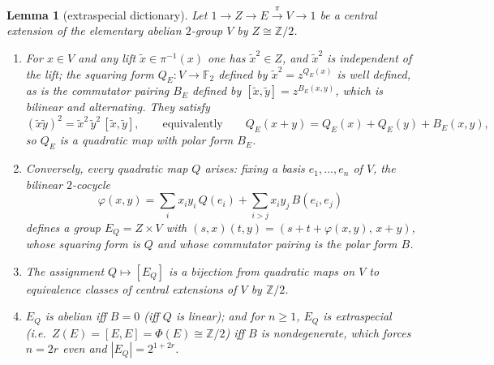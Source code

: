 \documentclass[11pt]{article}
\theoremstyle{plain}
\newtheorem{lemma}{Lemma}
\theoremstyle{definition}
\newcommand{\F}{\mathbb{F}}
\begin{document}
\begin{lemma}[extraspecial dictionary]\label{lem:extdict}
Let $1\to Z\to E\xrightarrow{\ \pi\ }V\to 1$ be a central extension of the
elementary abelian $2$-group $V$ by $Z\cong\mathbb{Z}/2$.
\begin{enumerate}[label=(\roman*),leftmargin=*]
\item For $x\in V$ and any lift $\tilde x\in\pi^{-1}(x)$ one has
$\tilde x^2\in Z$, and $\tilde x^2$ is independent of the lift; the
\emph{squaring form} $Q_E\colon V\to\F_2$ defined by
$\tilde x^2=z^{Q_E(x)}$ is well defined, as is the \emph{commutator pairing}
$B_E$ defined by $[\tilde x,\tilde y]=z^{B_E(x,y)}$, which is bilinear and
alternating. They satisfy
\[
(\tilde x\tilde y)^2=\tilde x^2\,\tilde y^2\,[\tilde x,\tilde y],
\qquad\text{equivalently}\qquad
Q_E(x+y)=Q_E(x)+Q_E(y)+B_E(x,y),
\]
so $Q_E$ is a quadratic map with polar form $B_E$.
\item Conversely, every quadratic map $Q$ arises: fixing a basis
$e_1,\dots,e_n$ of $V$, the bilinear $2$-cocycle
\[
\varphi(x,y)=\sum_i x_iy_i\,Q(e_i)+\sum_{i>j}x_iy_j\,B(e_i,e_j)
\]
defines a group $E_Q=Z\times V$ with
$(s,x)(t,y)=(s+t+\varphi(x,y),\,x+y)$, whose squaring form is $Q$ and whose
commutator pairing is the polar form $B$.
\item The assignment $Q\mapsto[E_Q]$ is a bijection from quadratic maps on
$V$ to equivalence classes of central extensions of $V$ by $\mathbb{Z}/2$.
\item $E_Q$ is abelian iff $B=0$ (iff $Q$ is linear); and for $n\geq 1$,
$E_Q$ is \emph{extraspecial} (i.e.\ $Z(E)=[E,E]=\Phi(E)\cong\mathbb{Z}/2$)
iff $B$ is nondegenerate, which forces $n=2r$ even and $|E_Q|=2^{1+2r}$.
\end{enumerate}
\end{lemma}
\end{document}
